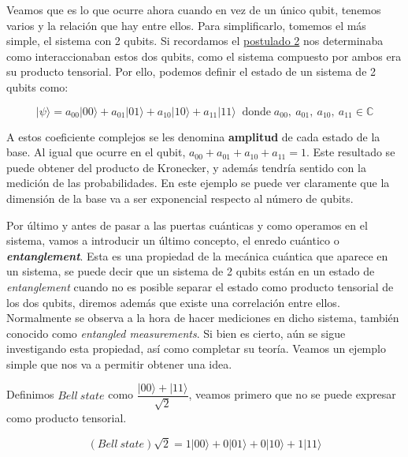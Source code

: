  Veamos que es lo que ocurre ahora cuando en vez de un único qubit, tenemos varios y la relación que hay entre ellos. Para simplificarlo, tomemos el más simple, el sistema con 2 qubits. Si recordamos el \hyperref[Postulado2]{postulado 2} nos determinaba como interaccionaban estos dos qubits, como el sistema compuesto por ambos era su producto tensorial. Por ello, podemos definir el estado de un sistema de 2 qubits como:

    \begin{equation*}|\psi\rangle = a_{00}|00\rangle + a_{01}|01\rangle + a_{10}|10\rangle + a_{11}|11\rangle \;\;\text{donde}\; a_{00},\: a_{01}, \:a_{10}, \:a_{11} \in \mathbb{C}
    \end{equation*}

 A estos coeficiente complejos se les denomina \textbf{amplitud} de cada estado de la base. Al igual que ocurre en el qubit, $a_{00}+a_{01}+a_{10}+a_{11}=1$. Este resultado se puede obtener del producto de Kronecker, y además tendría sentido con la medición de las probabilidades. En este ejemplo se puede ver claramente que la dimensión de la base va a ser exponencial respecto al número de qubits.\newline
 
 Por último y antes de pasar a las puertas cuánticas y como operamos en el sistema, vamos a introducir un último concepto, el enredo cuántico o \textbf{\textit{entanglement}}. Esta es una propiedad de la mecánica cuántica que aparece en un sistema, se puede decir que un sistema de 2 qubits están en un estado de \textit{entanglement} cuando no es posible separar el estado como producto tensorial de los dos qubits\cite{B:QuantumScientist:2008}, diremos además que existe una correlación entre ellos. Normalmente se observa a la hora de hacer mediciones en dicho sistema, también conocido como \textit{entangled measurements}. Si bien es cierto, aún se sigue investigando esta propiedad, así como completar su teoría\cite{B:Nielsen:2002}.  Veamos un ejemplo simple que nos va a permitir obtener una idea. \newline

 Definimos $Bell\:state $ como $ \dfrac{|00\rangle + |11\rangle}{\sqrt{2}}$, veamos primero que no se puede expresar como producto tensorial. 

 \begin{equation*}
     (Bell\:state)\sqrt{2} = 1|00\rangle+ 0|01\rangle+ 0|10\rangle+ 1|11\rangle
 \end{equation*}
 
 \vspace{3pt}

